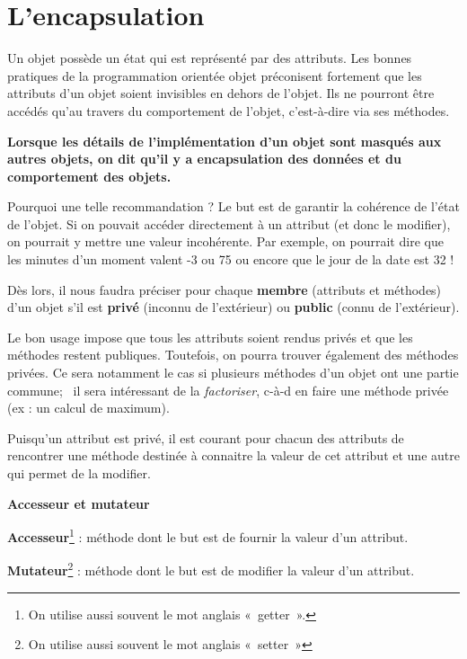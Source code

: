 \section{L'encapsulation}

Un objet possède un état qui est représenté par des attributs. Les
bonnes pratiques de la programmation orientée objet préconisent
fortement que les attributs d'un objet soient
invisibles en dehors de l'objet. Ils ne pourront être
accédés qu'au travers du comportement de
l'objet, c'est-à-dire via ses
méthodes.

{\sffamily\bfseries\upshape
{
Lorsque les détails de l'implémentation
d'un objet sont masqués aux autres objets, on dit
qu'il y a \textbf{encapsulation} des données et du
comportement des objets.}}


Pourquoi une telle recommandation ? Le but est de garantir la cohérence
de l'état de l'objet. Si on pouvait
accéder directement à un attribut (et donc le modifier), on pourrait y
mettre une valeur incohérente. Par exemple, on pourrait dire que les
minutes d'un moment valent -3 ou 75 ou encore que le
jour de la date est 32 !

Dès lors, il nous faudra préciser pour chaque \textbf{membre} (attributs
et méthodes) d'un objet s'il est
\textbf{privé} (inconnu de l'extérieur) ou
\textbf{public} (connu de l'extérieur). 

Le bon usage impose que tous les attributs soient rendus privés et que
les méthodes restent publiques. Toutefois, on pourra trouver également
des méthodes privées. Ce sera notamment le cas si plusieurs méthodes
d'un objet ont une partie commune; \ il sera
intéressant de la \textit{factoriser}, c-à-d en faire une méthode
privée (ex : un calcul de maximum).

Puisqu'un attribut est privé, il est courant pour
chacun des attributs de rencontrer une méthode destinée à connaitre la
valeur de cet attribut et une autre qui permet de la modifier.

\clearpage
{\sffamily\bfseries\upshape
Accesseur et mutateur}

{\sffamily\bfseries\upshape
{
\textbf{Accesseur}\footnote{{On utilise aussi
souvent le mot anglais «~getter~». }} : méthode dont le but est de
fournir la valeur d'un attribut.

\textbf{Mutateur}\footnote{{On utilise aussi
souvent le mot anglais «~setter~»}} : méthode dont le but est de
modifier la valeur d'un attribut.}}

